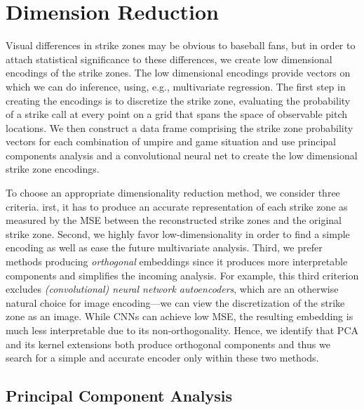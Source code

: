 \documentclass[letterpaper,12pt]{article}
\begin{document}


\section{Dimension Reduction}\label{sec:dimension}

Visual differences in strike zones may be obvious to baseball fans, but in order to attach statistical significance to these differences, we create low dimensional encodings of the strike zones.
The low dimensional encodings provide vectors on which we can do inference, using, e.g., multivariate regression. 
The first step in creating the encodings is to discretize the strike zone, evaluating the probability of a strike call at every point on a grid that spans the space of observable pitch locations. 
We then construct a data frame comprising the strike zone probability vectors for each combination of umpire and game situation and use principal components analysis and a convolutional neural net to create the low dimensional strike zone encodings.

To choose an appropriate dimensionality reduction method, we consider three criteria. 
irst, it has to produce an accurate representation of each strike zone as measured by the MSE between the reconstructed strike zones and the original strike zone. 
Second, we highly favor low-dimensionality in order to find a simple encoding as well as ease the future multivariate analysis. Third, we prefer methods producing \textit{orthogonal} embeddings since it produces more interpretable components and simplifies the incoming analysis. 
For example, this third criterion excludes \textit{(convolutional) neural network autoencoders}, which are an otherwise natural choice for image encoding---we can view the discretization of the strike zone as an image. 
While CNNs can achieve low MSE, the resulting embedding is much less interpretable due to its non-orthogonality. 
Hence, we identify that PCA and its kernel extensions both produce orthogonal components and thus we search for a simple and accurate encoder only within these two methods. 

\subsection{Principal Component Analysis}\label{sec:PCA}
\end{document}
